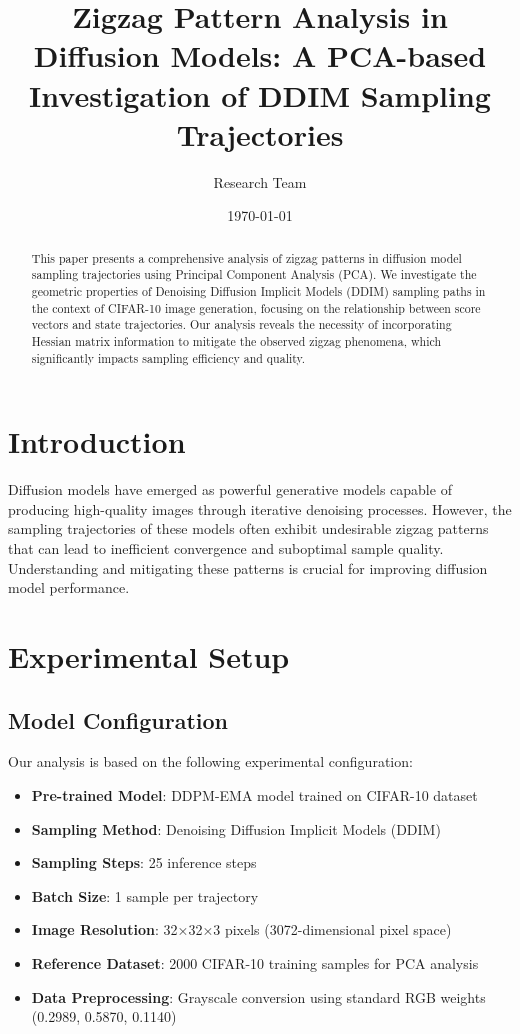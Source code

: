 \documentclass[11pt]{article}
\title{\textbf{Zigzag Pattern Analysis in Diffusion Models: A PCA-based Investigation of DDIM Sampling Trajectories}}
\author{Research Team}
\date{\today}
\begin{document}
\maketitle

\begin{abstract}
This paper presents a comprehensive analysis of zigzag patterns in diffusion model sampling trajectories using Principal Component Analysis (PCA). We investigate the geometric properties of Denoising Diffusion Implicit Models (DDIM) sampling paths in the context of CIFAR-10 image generation, focusing on the relationship between score vectors and state trajectories. Our analysis reveals the necessity of incorporating Hessian matrix information to mitigate the observed zigzag phenomena, which significantly impacts sampling efficiency and quality.
\end{abstract}

\section{Introduction}

Diffusion models have emerged as powerful generative models capable of producing high-quality images through iterative denoising processes. However, the sampling trajectories of these models often exhibit undesirable zigzag patterns that can lead to inefficient convergence and suboptimal sample quality. Understanding and mitigating these patterns is crucial for improving diffusion model performance.

\section{Experimental Setup}

\subsection{Model Configuration}
Our analysis is based on the following experimental configuration:

\begin{itemize}
\item \textbf{Pre-trained Model}: DDPM-EMA model trained on CIFAR-10 dataset
\item \textbf{Sampling Method}: Denoising Diffusion Implicit Models (DDIM)
\item \textbf{Sampling Steps}: 25 inference steps
\item \textbf{Batch Size}: 1 sample per trajectory
\item \textbf{Image Resolution}: 32×32×3 pixels (3072-dimensional pixel space)
\item \textbf{Reference Dataset}: 2000 CIFAR-10 training samples for PCA analysis
\item \textbf{Data Preprocessing}: Grayscale conversion using standard RGB weights (0.2989, 0.5870, 0.1140)
\end{itemize}
\end{document}

